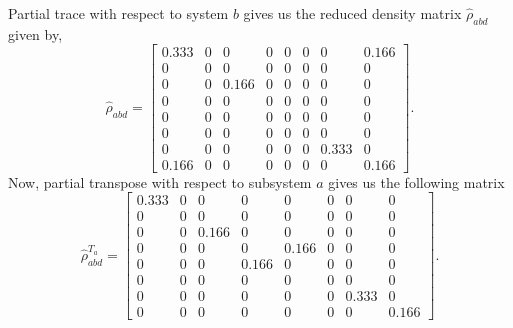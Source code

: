 \documentclass{amsart}
\theoremstyle{plain}
\theoremstyle{definition}
\theoremstyle{plain}
\begin{document}
Partial trace with respect to system $b$ gives us the reduced density matrix $\hat{\rho}_{abd}$ given by,
\begin{equation*}
	\hat{\rho}_{abd} = \left[\begin{matrix}0.333 & 0 & 0 & 0 & 0 & 0 & 0 & 0.166\\0 & 0 & 0 & 0 & 0 & 0 & 0 & 0\\0 & 0 & 0.166 & 0 & 0 & 0 & 0 & 0\\0 & 0 & 0 & 0 & 0 & 0 & 0 & 0\\0 & 0 & 0 & 0 & 0 & 0 & 0 & 0\\0 & 0 & 0 & 0 & 0 & 0 & 0 & 0\\0 & 0 & 0 & 0 & 0 & 0 & 0.333 & 0\\0.166 & 0 & 0 & 0 & 0 & 0 & 0 & 0.166\end{matrix}\right].
\end{equation*}
Now, partial transpose with respect to subsystem $a$ gives us the following matrix
\begin{equation*}
	\hat{\rho}^{T_a}_{abd} =\left[\begin{matrix}0.333 & 0 & 0 & 0 & 0 & 0 & 0 & 0\\0 & 0 & 0 & 0 & 0 & 0 & 0 & 0\\0 & 0 & 0.166 & 0 & 0 & 0 & 0 & 0\\0 & 0 & 0 & 0 & 0.166 & 0 & 0 & 0\\0 & 0 & 0 & 0.166 & 0 & 0 & 0 & 0\\0 & 0 & 0 & 0 & 0 & 0 & 0 & 0\\0 & 0 & 0 & 0 & 0 & 0 & 0.333 & 0\\0 & 0 & 0 & 0 & 0 & 0 & 0 & 0.166\end{matrix}\right]	.
\end{equation*}
\end{document}
